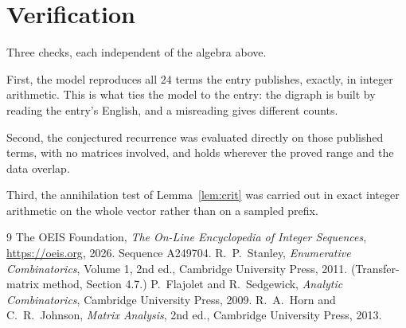 \documentclass[11pt,a4paper]{article}
\theoremstyle{plain}
\theoremstyle{definition}
\begin{document}
\section{Verification}

Three checks, each independent of the algebra above.

First, the model reproduces all $24$ terms the entry publishes, exactly, in integer
arithmetic. This is what ties the model to the entry: the digraph is built by reading the
entry's English, and a misreading gives different counts.

Second, the conjectured recurrence was evaluated directly on those published terms, with no
matrices involved, and holds wherever the proved range and the data overlap.

Third, the annihilation test of Lemma~\ref{lem:crit} was carried out in exact integer
arithmetic on the whole vector rather than on a sampled prefix.

\begin{thebibliography}{9}
 The OEIS Foundation, \emph{The On-Line Encyclopedia of Integer
Sequences}, \url{https://oeis.org}, 2026. Sequence A249704.
 R.~P.~Stanley, \emph{Enumerative Combinatorics}, Volume 1, 2nd ed.,
Cambridge University Press, 2011. (Transfer-matrix method, Section 4.7.)
 P.~Flajolet and R.~Sedgewick, \emph{Analytic Combinatorics}, Cambridge
University Press, 2009.
 R.~A.~Horn and C.~R.~Johnson, \emph{Matrix Analysis}, 2nd ed., Cambridge
University Press, 2013.
\end{thebibliography}
\end{document}
